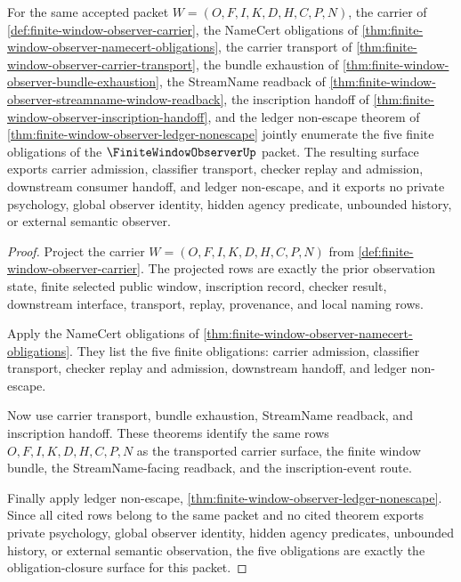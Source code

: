 \begin{theorem}
\label{thm:finite-window-observer-obligation-closure-surface}
For the same accepted packet $W=(O,F,I,K,D,H,C,P,N)$, the carrier of \autoref{def:finite-window-observer-carrier}, the NameCert obligations of \autoref{thm:finite-window-observer-namecert-obligations}, the carrier transport of \autoref{thm:finite-window-observer-carrier-transport}, the bundle exhaustion of \autoref{thm:finite-window-observer-bundle-exhaustion}, the StreamName readback of \autoref{thm:finite-window-observer-streamname-window-readback}, the inscription handoff of \autoref{thm:finite-window-observer-inscription-handoff}, and the ledger non-escape theorem of \autoref{thm:finite-window-observer-ledger-nonescape} jointly enumerate the five finite obligations of the $\FiniteWindowObserverUp$ packet. The resulting surface exports carrier admission, classifier transport, checker replay and admission, downstream consumer handoff, and ledger non-escape, and it exports no private psychology, global observer identity, hidden agency predicate, unbounded history, or external semantic observer.
\end{theorem}
\begin{proof}
Project the carrier $W=(O,F,I,K,D,H,C,P,N)$ from \autoref{def:finite-window-observer-carrier}. The projected rows are exactly the prior observation state, finite selected public window, inscription record, checker result, downstream interface, transport, replay, provenance, and local naming rows.

Apply the NameCert obligations of \autoref{thm:finite-window-observer-namecert-obligations}. They list the five finite obligations: carrier admission, classifier transport, checker replay and admission, downstream handoff, and ledger non-escape.

Now use carrier transport, bundle exhaustion, StreamName readback, and inscription handoff. These theorems identify the same rows $O,F,I,K,D,H,C,P,N$ as the transported carrier surface, the finite window bundle, the StreamName-facing readback, and the inscription-event route.

Finally apply ledger non-escape, \autoref{thm:finite-window-observer-ledger-nonescape}. Since all cited rows belong to the same packet and no cited theorem exports private psychology, global observer identity, hidden agency predicates, unbounded history, or external semantic observation, the five obligations are exactly the obligation-closure surface for this packet.
\end{proof}

